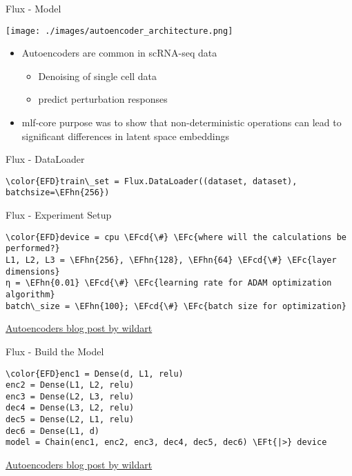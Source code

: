 \documentclass[bigger]{beamer}
\newcommand{\EFc}[1]{\textcolor{EFc}{#1}} %
\newcommand{\EFcd}[1]{\textcolor{EFcd}{#1}} %
\newcommand{\EFt}[1]{\textcolor{EFt}{#1}} %
\newcommand{\EFhn}[1]{\textcolor{EFhn}{\textbf{#1}}} %
\begin{document}
\begin{frame}[label={sec:orga25b0e8}]{Flux - Model}
\begin{center}
\texttt{[image: ./images/autoencoder\_architecture.png]}
\end{center}

\begin{itemize}
\item Autoencoders are common in scRNA-seq data
\begin{itemize}
\item Denoising of single cell data
\item predict perturbation responses
\end{itemize}

\item mlf-core purpose was to show that \alert{non-deterministic operations} can lead to
significant differences in \alert{latent space embeddings}
\end{itemize}
\end{frame}
\begin{frame}[label={sec:org7569710},fragile]{Flux - DataLoader}
 \begin{Code}
\begin{Verbatim}
\color{EFD}train\_set = Flux.DataLoader((dataset, dataset), batchsize=\EFhn{256})
\end{Verbatim}
\end{Code}
\end{frame}

\begin{frame}[label={sec:orgd5ba938},fragile]{Flux - Experiment Setup}
 \begin{Code}
\begin{Verbatim}
\color{EFD}device = cpu \EFcd{\#} \EFc{where will the calculations be performed?}
L1, L2, L3 = \EFhn{256}, \EFhn{128}, \EFhn{64} \EFcd{\#} \EFc{layer dimensions}
η = \EFhn{0.01} \EFcd{\#} \EFc{learning rate for ADAM optimization algorithm}
batch\_size = \EFhn{100}; \EFcd{\#} \EFc{batch size for optimization}
\end{Verbatim}
\end{Code}

\href{https://wildart.github.io/post/autoencoders/}{Autoencoders blog post by wildart}
\end{frame}


\begin{frame}[label={sec:orgfe9e1b2},fragile]{Flux - Build the Model}
 \begin{Code}
\begin{Verbatim}
\color{EFD}enc1 = Dense(d, L1, relu)
enc2 = Dense(L1, L2, relu)
enc3 = Dense(L2, L3, relu)
dec4 = Dense(L3, L2, relu)
dec5 = Dense(L2, L1, relu)
dec6 = Dense(L1, d)
model = Chain(enc1, enc2, enc3, dec4, dec5, dec6) \EFt{|>} device
\end{Verbatim}
\end{Code}

\href{https://wildart.github.io/post/autoencoders/}{Autoencoders blog post by wildart}
\end{frame}
\end{document}
